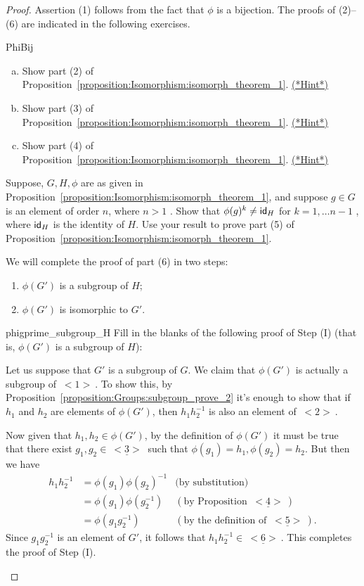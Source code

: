 \begin{proof}
Assertion (1) follows from the fact that $\phi$ is a bijection.  The proofs of (2)--(6) are indicated in the following exercises.

\begin{exercise}{PhiBij}
\begin{enumerate}[(a)]
\item 
Show part (2) of Proposition~\ref{proposition:Isomorphism:isomorph_theorem_1}.
\hyperref[sec:Isomorphism:hints]{(*Hint*)}
\item
Show part (3) of Proposition~\ref{proposition:Isomorphism:isomorph_theorem_1}.
\hyperref[sec:Isomorphism:hints]{(*Hint*)}
\item
Show part (4) of Proposition~\ref{proposition:Isomorphism:isomorph_theorem_1}.
\hyperref[sec:Isomorphism:hints]{(*Hint*)}
\end{enumerate}
\end{exercise} 

\begin{exercise}{}
Suppose, $G, H, \phi$ are as given  in Proposition~\ref{proposition:Isomorphism:isomorph_theorem_1}, and suppose $g \in G$ is an element of order $n$, where $n>1$ . Show that 
$\phi(g)^k \neq {\sf{i}d}_H$ for $k=1,\ldots n-1$ , where ${\sf{i}d}_H$ is the identity of $H$.  Use your result to prove part (5) of  Proposition~\ref{proposition:Isomorphism:isomorph_theorem_1}.
\end{exercise}

\noindent
We will complete the proof of part (6) in two steps:
\begin{enumerate}[Step (I):~~]
\item
$\phi(G')$ is a subgroup of $H$;
\item
$\phi(G')$ is isomorphic to $G'$.
\end{enumerate}

\begin{exercise}{phigprime_subgroup_H} Fill in the blanks of the following proof of Step (I)  (that is, $\phi(G')$ is a subgroup of $H$):
\medskip

Let us suppose that $G'$ is a subgroup of $G$. We claim that $\phi(G')$ is actually a subgroup of \underline{$~<1>~$}.  To show this, by Proposition~\ref{proposition:Groups:subgroup_prove_2} it's enough to show that if $h_1$ and $h_2$ are elements of  $\phi(G')$, then $h_1 h_2^{-1}$ is also an element of \underline{$~<2>~$}.

Now given that  $h_1, h_2 \in \phi(G')$, by the definition of $\phi(G')$ it must be true that there exist $g_1, g_2 \in \underline{~<3>~}$ such that $\phi(g_1) = h_1, \phi(g_2) = h_2$. But then we have 
\begin{align*}
h_1 h_2^{-1} &= \phi(g_1) \phi(g_2)^{-1} &\text{(by substitution)}\\
&= \phi(g_1) \phi(g_2^{-1}) &(\text{by Proposition~}\underline{~<4>~})\\
&= \phi(g_1 g_2^{-1}) &(\text{by the definition of }\underline{~<5>~}).
\end{align*}
Since $g_1 g_2^{-1}$ is an element of $G'$, it follows that $h_1 h_2^{-1} \in \underline{~<6>~}$. This completes the proof of Step (I).
\end{exercise}


\end{proof}
